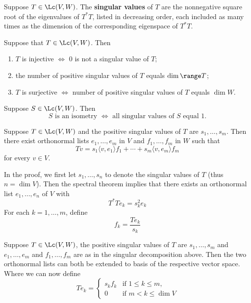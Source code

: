 \documentclass{extarticle}
\begin{document}
\begin{definition}
    Suppose \(T \in \Lc(V, W)\). The \textbf{singular values} of \(T\) are the nonnegative square
    root of the eigenvalues of \(T^* T\), listed in decreasing order, each included as many
    times as the dimension of the corresponding eigenspace of \(T^*T\).
\end{definition}

\begin{thm}
    Suppose that \(T \in \Lc(V, W)\). Then
    \begin{enumerate}[label=(\alph*)]
        \item \(T\) is injective \(\Longleftrightarrow\) 0 is not a singular value of \(T\);
        \item the number of positive singular values of \(T\) equals \(\dim \range T\);
        \item \(T\) is surjective \(\Longleftrightarrow\) number of positive singular values of \(T\) equals \(\dim W\).
    \end{enumerate}
\end{thm}

\begin{corollary}
    Suppose \(S \in \Lc(V, W)\). Then
    \[S \text{ is an isometry } \Longleftrightarrow \text{ all singular values of } S \text{ equal 1.}\]
\end{corollary}

\begin{thm}[\textcolor{red}{SINGULAR VALUE DECOMPOSITION}]
    Suppose \(T \in \Lc(V, W)\) and the positive singular values of \(T\) are \(s_1, \ldots, s_m\).
    Then there exist orthonormal lists \(e_1, \ldots, e_m\) in \(V\) and \(f_1, \ldots, f_m\) in \(W\)
    such that
    \[Tv = s_1 \langle v,e_1 \rangle f_1 + \cdots + s_m \langle v,e_m \rangle f_m\]
    for every \(v \in V\).
\end{thm}

\begin{remark}
    In the proof, we first let \(s_1, \ldots, s_n\) to denote the singular values of \(T\) (thus
    \(n = \dim V\)). Then the spectral theorem implies that there exists an orthonormal list \(e_1, \ldots, e_n\)
    of \(V\) with
    \[T^* T e_k = s_k^2 e_k\]
    For each \(k = 1, \ldots, m\), define
    \[f_k = \frac{T e_k}{s_k}\]
\end{remark}

\begin{remark}
    Suppose \(T \in \Lc(V, W)\), the positive singular values of \(T\) are \(s_1, \ldots, s_m\)
    and \(e_1, \ldots, e_m\) and \(f_1, \ldots, f_m\) are as in the singular decomposition above.
    Then the two orthonormal lists can both be extended to basis of the respective vector space.  Where
    we can now define
    \[Te_k = \begin{cases}
        s_k f_k &\text{if } 1 \leq k \leq m, \\
        0 &\text{if } m < k \leq \dim V
    \end{cases}\]
\end{remark}
\end{document}
